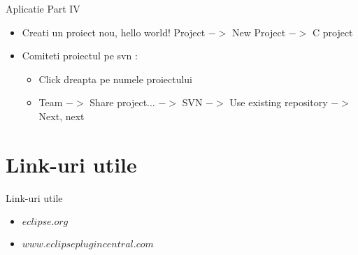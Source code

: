 \documentclass{beamer}
\begin{document}
\begin{frame}{Aplicatie Part IV}
\begin{itemize}
  \item Creati un proiect nou, hello world! Project $->$ New Project $->$ C project
  \item Comiteti proiectul pe svn :
  \begin{itemize}
    \item Click dreapta pe numele proiectului
    \item Team $->$ Share project... $->$ SVN $->$ Use existing repository $->$ Next, next
  \end{itemize}
\end{itemize}
\end{frame}

\section{Link-uri utile}
\frame{\tableofcontents[currentsection]}
\begin{frame}{Link-uri utile}
\begin{itemize}
  \item $eclipse.org$
  \item $www.eclipseplugincentral.com$
\end{itemize}
\end{frame}
\end{document}

